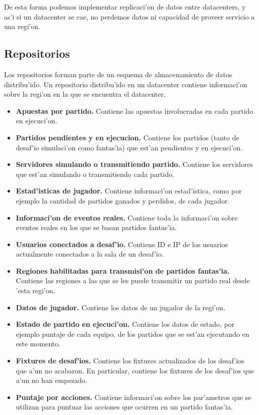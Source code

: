 \noident
De esta forma podemos implementar replicaci'on de datos entre datacenters, y as'i si un datacenter se cae, no perdemos datos ni capacidad de proveer servicio a una regi'on.

\subsection{Repositorios}

Los repositorios forman parte de un esquema de almacenamiento de datos distribu'ido. Un repositorio distribu'ido en un datacenter contiene informaci'on sobre la regi'on en la que se encuentra el datacenter.

\begin{itemize}
	\item \textbf{Apuestas por partido.} Contiene las apuestas involucradas en cada partido en ejecuci'on.
	\item \textbf{Partidos pendientes y en ejecucion.} Contiene los partidos (tanto de desaf'io simulaci'on como fantas'ia) que est'an pendientes y en ejecuci'on.
	\item \textbf{Servidores simulando o transmitiendo partido.} Contiene los servidores que est'an simulando o transmitiendo cada partido.
	\item \textbf{Estad'isticas de jugador.} Contiene informaci'on estad'istica, como por ejemplo la cantidad de partidos ganados y perdidos, de cada jugador.
	\item \textbf{Informaci'on de eventos reales.} Contiene toda la informaci'on sobre eventos reales en los que se basan partidos fantas'ia.
	\item \textbf{Usuarios conectados a desaf'io.} Contiene ID e IP de los usuarios actualmente conectados a la sala de un desaf'io.
	\item \textbf{Regiones habilitadas para transmisi'on de partidos fantas'ia.} Contiene las regiones a las que se les puede transmitir un partido real desde 'esta regi'on.
	\item \textbf{Datos de jugador.} Contiene los datos de un jugador de la regi'on.
	\item \textbf{Estado de partido en ejecuci'on.} Contiene los datos de estado, por ejemplo puntaje de cada equipo, de los partidos que se est'an ejecutando en este momento.
	\item \textbf{Fixtures de desaf'ios.} Contiene los fixtures actualizados de los desaf'ios que a'un no acabaron. En particular, contiene los fixtures de los desaf'ios que a'un no han empezado.
	\item \textbf{Puntaje por acciones.} Contiene informaci'on sobre los par'ametros que se utilizan para puntuar las acciones que ocurren en un partido fantas'ia.

\end{itemize}
